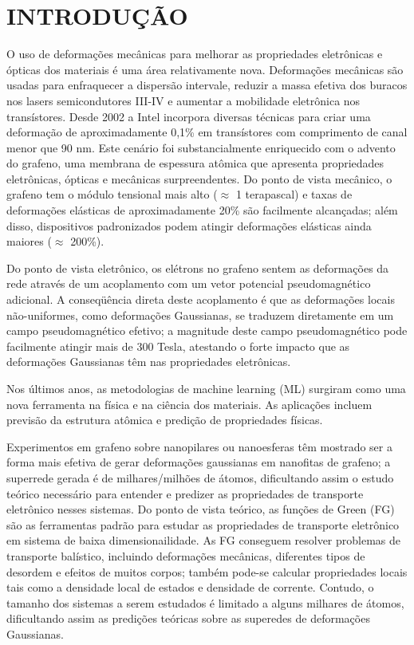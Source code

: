 \chapter{INTRODUÇÃO}
\label{sec:introducao}
O uso de deformações mecânicas para melhorar as propriedades eletrônicas e ópticas dos materiais é uma área relativamente nova. Deformações mecânicas são usadas para enfraquecer a dispersão intervale, reduzir a massa efetiva dos buracos nos lasers semicondutores III-IV e aumentar a mobilidade eletrônica nos transístores. Desde 2002 a Intel incorpora diversas técnicas para criar uma deformação de aproximadamente 0,1\% em transístores com comprimento de canal menor que 90 nm. Este cenário foi substancialmente enriquecido com o advento do grafeno, uma membrana de espessura atômica que apresenta propriedades eletrônicas, ópticas e mecânicas surpreendentes. 
Do ponto de vista mecânico, o grafeno tem o módulo tensional mais alto ($\approx$ 1 terapascal) e taxas de deformações elásticas de aproximadamente 20\% são facilmente alcançadas; além disso, dispositivos padronizados podem atingir deformações elásticas ainda maiores ($\approx$ 200\%). 

Do ponto de vista eletrônico, os elétrons no grafeno sentem as deformações da rede através de um acoplamento com um vetor potencial pseudomagnético adicional. A conseqüência direta deste acoplamento é que as deformações locais não-uniformes, como deformações Gaussianas, se traduzem diretamente em um campo pseudomagnético efetivo; a magnitude deste campo pseudomagnético pode facilmente atingir mais de 300 Tesla, atestando o forte impacto que as deformações Gaussianas têm nas propriedades eletrônicas.

Nos últimos anos, as metodologias de machine learning (ML) surgiram como uma nova ferramenta na física e na ciência dos materiais. As aplicações incluem previsão da estrutura atômica e predição de propriedades físicas.

Experimentos em grafeno sobre nanopilares ou nanoesferas têm mostrado ser a forma mais efetiva de gerar deformações gaussianas em nanofitas de grafeno; a superrede gerada é de milhares/milhões de átomos, dificultando assim o estudo teórico necessário para entender e predizer as propriedades de transporte eletrônico nesses sistemas. Do ponto de vista teórico, as funções de Green (FG) são as ferramentas padrão para estudar as propriedades de transporte eletrônico em sistema de baixa dimensionailidade. As FG conseguem resolver problemas de transporte balístico, incluindo deformações mecânicas, diferentes tipos de desordem e efeitos de muitos corpos; também pode-se calcular propriedades locais tais como a densidade local de estados e densidade de corrente. Contudo, o tamanho dos sistemas a serem estudados é limitado a alguns milhares de átomos, dificultando assim as predições teóricas sobre as superedes de deformações Gaussianas.

